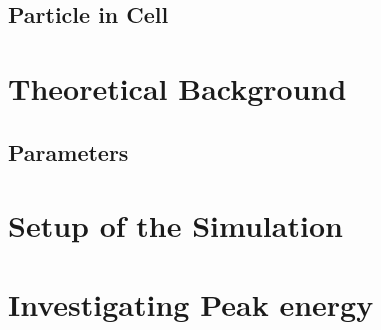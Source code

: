 \section{Particle in Cell}

\chapter{Theoretical Background}
\section{Parameters}

\chapter{Setup of the Simulation}
\chapter{Investigating Peak energy}



